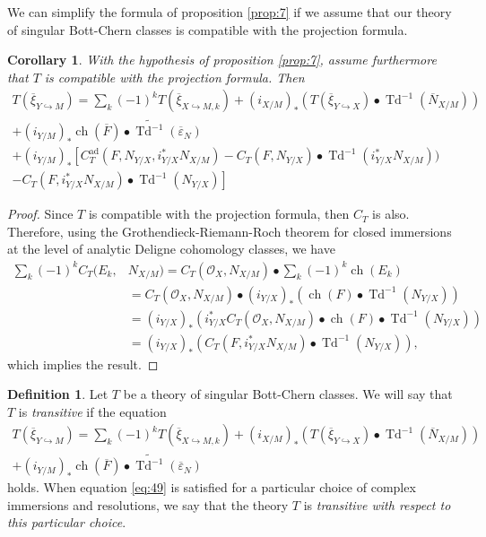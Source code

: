 \documentclass[10pt,twoside]{article}
\numberwithin{equation}{section}
\theoremstyle{plain}
\newtheorem{corollary}[equation]{Corollary}
\theoremstyle{definition}
\newtheorem{definition}[equation]{Definition}
\DeclareMathOperator{\Td}{Td}
\DeclareMathOperator{\ch}{ch}
\DeclareMathOperator{\ad}{ad}
\begin{document}
We can simplify the formula of proposition \ref{prop:7} if we assume
that our theory of singular Bott-Chern classes is compatible with the
projection formula.  

\begin{corollary} \label{cor:5}
  With the hypothesis of proposition \ref{prop:7}, assume furthermore
  that $T$ is compatible with the projection formula. Then
  \begin{multline*}
    T(\overline \xi_{Y\hookrightarrow M})=
    \sum_{k}(-1)^{k}T(\overline \xi _{X\hookrightarrow
      M,k})+(i_{X/M})_{\ast}(T(\overline \xi_{Y\hookrightarrow X})\bullet
    \Td^{-1}(\overline N_{X/M}))\\ 
    +
    (i_{Y/M})_{\ast}\ch(\overline F)\bullet\widetilde
    {\Td^{-1}}(\overline {\varepsilon }_{N})\\
    +(i_{Y/M})_{\ast}\left[C^{\ad}_{T}(F,N_{Y/X},i_{Y/X}^{\ast}N_{X/M})-
    C_{T}(F,N_{Y/X})\bullet\Td^{-1}(i_{Y/X}^{\ast}N_{X/M}))\right.\\\left. 
    -C_{T}(F,i_{Y/X}^{\ast}N_{X/M})\bullet\Td^{-1}(N_{Y/X})\right]
  \end{multline*}    
\end{corollary}
\begin{proof}
  Since $T$ is compatible with the projection formula, then $C_{T}$ is also.
 Therefore, using the Grothendieck-Riemann-Roch
  theorem for
  closed immersions 
  at the level of analytic Deligne cohomology classes, we have 
  \begin{align*}
    \sum_{k}(-1)^{k}
    C_{T}(E_{k},&N_{X/M})=C_{T}(\mathcal{O}_{X},N_{X/M})\bullet
    \sum_{k}(-1)^{k} \ch(E_{k})\\
    &=C_{T}(\mathcal{O}_{X},N_{X/M})\bullet
    (i_{Y/X})_{\ast}(\ch(F)\bullet \Td^{-1}(N_{Y/X}))\\
    &=(i_{Y/X})_{\ast}(i_{Y/X}^{\ast}C_{T}(\mathcal{O}_{X},N_{X/M})\bullet
    \ch(F)\bullet \Td^{-1}(N_{Y/X}))\\
    &=(i_{Y/X})_{\ast}(C_{T}(F,i_{Y/X}^{\ast}N_{X/M})\bullet
    \Td^{-1}(N_{Y/X})),
  \end{align*}
  which implies the result.
\end{proof}

\begin{definition} 
  Let $T$ be a theory of singular Bott-Chern classes. We will say that
  $T$ is \emph{transitive} if the equation
  \begin{multline}\label{eq:49}
    T(\overline \xi_{Y\hookrightarrow M})=
    \sum_{k}(-1)^{k}T(\overline \xi _{X\hookrightarrow
      M,k})+(i_{X/M})_{\ast}(T(\overline \xi_{Y\hookrightarrow X})\bullet
    \Td^{-1}(\overline N_{X/M}))\\
    +
    (i_{Y/M})_{\ast}\ch(\overline F)\bullet\widetilde
    {\Td^{-1}}(\overline {\varepsilon }_{N})
  \end{multline}
  holds.
  When equation \eqref{eq:49} is satisfied for a particular choice of
  complex immersions and resolutions, we say that the theory $T$ is
  \emph{transitive with respect to this particular choice}.
\end{definition}
\end{document}
